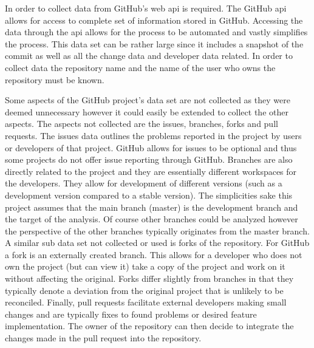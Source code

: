 
In order to collect data from GitHub's web \gls{api} is required. The GitHub \gls{api} allows for access to complete set of information stored in GitHub. Accessing the data through the \gls{api} allows for the process to be automated and vastly simplifies the process. This data set can be rather large since it includes a snapshot of the commit as well as all the change data and developer data related. In order to collect data the repository name and the name of the user who owns the repository must be known.


Some aspects of the GitHub project's data set are not collected as they were deemed unnecessary however it could easily be extended to collect the other aspects. The aspects not collected are the issues, branches, forks and pull requests. The issues data outlines the problems reported in the project by users or developers of that project. GitHub allows for issues to be optional and thus some projects do not offer issue reporting through GitHub. Branches are also directly related to the project and they are essentially different workspaces for the developers. They allow for development of different versions (such as a development version compared to a stable version). The simplicities sake this project assumes that the main branch (master) is the development branch and the target of the analysis. Of course other branches could be analyzed however the perspective of the other branches typically originates from the master branch. A similar sub data set not collected or used is forks of the repository. For GitHub a fork is an externally created branch. This allows for a developer who does not own the project (but can view it) take a copy of the project and work on it without affecting the original. Forks differ slightly from branches in that they typically denote a deviation from the original project that is unlikely to be reconciled. Finally, pull requests facilitate external developers making small changes and are typically fixes to found problems or desired feature implementation. The owner of the repository can then decide to integrate the changes made in the pull request into the repository.


